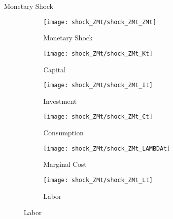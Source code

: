 \documentclass[../quali_slides.tex]{subfiles}
\begin{document}
\begin{frame}{Monetary Shock}
	
	\begin{figure}[h!]
		\centering
		\begin{subfigure}[b]{0.3\textwidth}
			\centering
			\texttt{[image: shock\_ZMt/shock\_ZMt\_ZMt]}
			\caption{Monetary Shock}
			\label{fig:ZMt-monetary-shock}
		\end{subfigure}
		\hfill
		\begin{subfigure}[b]{0.3\textwidth}
			\centering
			\texttt{[image: shock\_ZMt/shock\_ZMt\_Kt]}
			\caption{Capital}
			\label{fig:ZMt-capital}
		\end{subfigure}
		\hfill
		\begin{subfigure}[b]{0.3\textwidth}
			\centering
			\texttt{[image: shock\_ZMt/shock\_ZMt\_It]}
			\caption{Investment}
			\label{fig:ZMt-investment}
		\end{subfigure}
		\hfill
		
		\vspace*{0.5cm}
		
		\begin{subfigure}[b]{0.3\textwidth}
			\centering
			\texttt{[image: shock\_ZMt/shock\_ZMt\_Ct]}
			\caption{Consumption}
			\label{fig:ZMt-consumption}
		\end{subfigure}
		\hfill
		\begin{subfigure}[b]{0.3\textwidth}
			\centering
			\texttt{[image: shock\_ZMt/shock\_ZMt\_LAMBDAt]}
			\caption{Marginal Cost}
			\label{fig:ZMt-marginal-cost}
		\end{subfigure}
		\hfill
		\begin{subfigure}[b]{0.3\textwidth}
			\centering
			\texttt{[image: shock\_ZMt/shock\_ZMt\_Lt]}
			\caption{Labor}
			\label{fig:ZMt-labor}
		\end{subfigure}
		\hfill
		
	\end{figure}
	
\end{frame}
\end{document}
